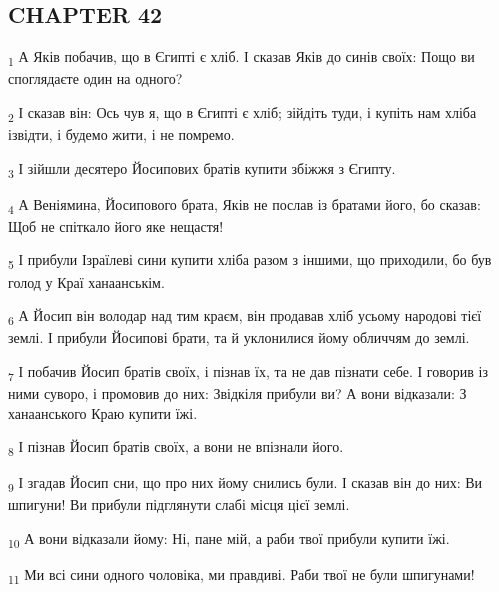 \subsection{CHAPTER 42}
\begin{tcolorbox}
\textsubscript{1} А Яків побачив, що в Єгипті є хліб. І сказав Яків до синів своїх: Пощо ви споглядаєте один на одного?
\end{tcolorbox}
\begin{tcolorbox}
\textsubscript{2} І сказав він: Ось чув я, що в Єгипті є хліб; зійдіть туди, і купіть нам хліба ізвідти, і будемо жити, і не помремо.
\end{tcolorbox}
\begin{tcolorbox}
\textsubscript{3} І зійшли десятеро Йосипових братів купити збіжжя з Єгипту.
\end{tcolorbox}
\begin{tcolorbox}
\textsubscript{4} А Веніямина, Йосипового брата, Яків не послав із братами його, бо сказав: Щоб не спіткало його яке нещастя!
\end{tcolorbox}
\begin{tcolorbox}
\textsubscript{5} І прибули Ізраїлеві сини купити хліба разом з іншими, що приходили, бо був голод у Краї ханаанськім.
\end{tcolorbox}
\begin{tcolorbox}
\textsubscript{6} А Йосип він володар над тим краєм, він продавав хліб усьому народові тієї землі. І прибули Йосипові брати, та й уклонилися йому обличчям до землі.
\end{tcolorbox}
\begin{tcolorbox}
\textsubscript{7} І побачив Йосип братів своїх, і пізнав їх, та не дав пізнати себе. І говорив із ними суворо, і промовив до них: Звідкіля прибули ви? А вони відказали: З ханаанського Краю купити їжі.
\end{tcolorbox}
\begin{tcolorbox}
\textsubscript{8} І пізнав Йосип братів своїх, а вони не впізнали його.
\end{tcolorbox}
\begin{tcolorbox}
\textsubscript{9} І згадав Йосип сни, що про них йому снились були. І сказав він до них: Ви шпигуни! Ви прибули підглянути слабі місця цієї землі.
\end{tcolorbox}
\begin{tcolorbox}
\textsubscript{10} А вони відказали йому: Ні, пане мій, а раби твої прибули купити їжі.
\end{tcolorbox}
\begin{tcolorbox}
\textsubscript{11} Ми всі сини одного чоловіка, ми правдиві. Раби твої не були шпигунами!
\end{tcolorbox}
